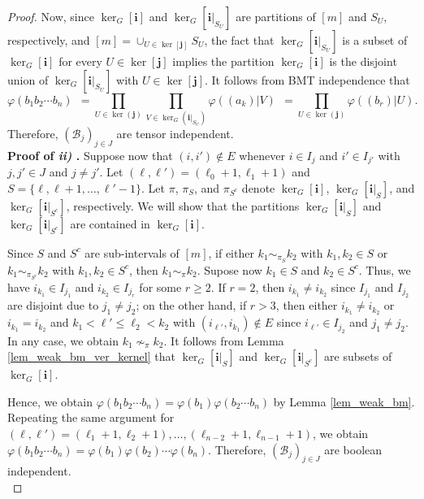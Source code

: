 \documentclass[10pt,a4paper]{amsart}
\begin{document}
\begin{proof}
	Now, since $\ker_G[\bm{i}]$ and $\ker_G[\bm{i}|_{S_U}]$ are partitions of $[m]$ and $S_U$, respectively, and $[m] = \cup_{U \in \ker[\bm{j}]} S_U$, the fact that $\ker_G[\bm{i}|_{S_U}]$ is a subset of $\ker_G[\bm{i}]$ for every $U \in \ker[\bm{j}]$ implies the partition $\ker_G[\bm{i}]$ is the disjoint union of $\ker_G[\bm{i}|_{S_U}]$ with $U \in \ker[\bm{j}]$. 
	It follows from BMT independence that    
	\[
	\varphi( b_1 b_2 \cdots b_n )
	\ \ =  
	\prod_{U \in \ker(\bm{j})} \prod_{ V \in \ker_G(\bm{i}|_{S_U})} \varphi \left( (a_k) | V  \right)
	\ \ =  \prod_{U \in \ker(\bm{j})}  \varphi \left( (b_r) | U  \right). 
	\]
	Therefore,  $(\mathcal{B}_j)_{j \in J}$ are tensor independent. \ \\
	
	
	
	\noindent \textbf{Proof of \emph{ii)}
		.} Suppose now that $(i,i') \notin E$ whenever $i \in I_{j}$ and $i' \in I_{j'}$ with $j,j' \in J$ and $j \neq j'$. 
	Let $(\ell,\ell') = (\ell_0+1,\ell_1+1 )$ and $S = \{ \ell, \ell+1, \ldots, \ell'-1 \}$. 
	Let $\pi$, $\pi_S$, and $\pi_{S^c}$ denote $\ker_G[\bm{i}]$, $\ker_G[\bm{i}|_S]$, and $\ker_G[\bm{i}|_{S^c}]$, respectively.  
	We will show that the partitions $\ker_G[\bm{i}|_S]$ and $\ker_G[\bm{i}|_{S^c}]$ are contained in  $\ker_G[\bm{i}]$. 
	
	Since $S$ and $S^c$ are sub-intervals of $[m]$, if either $k_1 \sim_{\pi_S} k_2$ with $k_1,k_2 \in S$ or $k_1 \sim_{\pi_{S^c}} k_2$ with $k_1,k_2 \in S^c$, then $k_1 \sim_\pi k_2$.
	Supose now $k_1 \in S$ and $k_2 \in S^c$. 
	Thus, we have $i_{k_1} \in I_{j_1}$ and $i_{k_2} \in I_{j_r}$ for some $r \geq 2$. 
	If $r=2$, then $i_{k_1} \neq i_{k_2}$ since $I_{j_1}$ and $I_{j_2}$ are disjoint due to $j_1 \neq j_2$;
	on the other hand, if $r >3$, then either $i_{k_1} \neq i_{k_2}$ or $i_{k_1} = i_{k_2}$ and $k_1 < \ell' \leq \ell_2 < k_2$ with  $(i_{\ell'},i_{k_1}) \notin E$ since $i_{\ell'} \in I_{j_2}$  and $j_1 \neq j_2$. 
	In any case, we obtain $k_1 \nsim_{\pi} k_2$. 
	It follows from Lemma \ref{lem_weak_bm_ver_kernel} that $\ker_G[\bm{i}|_S]$ and $\ker_G[\bm{i}|_{S^c}]$ are subsets of $\ker_G[\bm{i}]$. 
	
	Hence, we obtain $\varphi(b_1 b_2 \cdots b_n)  = \varphi(b_1) \varphi(b_2 \cdots b_n)$ by Lemma \ref{lem_weak_bm}.  
	Repeating the same argument for $(\ell,\ell')=(\ell_1+1,\ell_2+1),\ldots,(\ell_{n-2}+1,\ell_{n-1}+1)$, we obtain $\varphi(b_1 b_2 \cdots b_n)  = \varphi(b_1) \varphi(b_2) \cdots \varphi(b_n)$. 
	Therefore, $(\mathcal{B}_j)_{j \in J}$ are boolean independent. \ \\
	

\end{proof}
\end{document}
